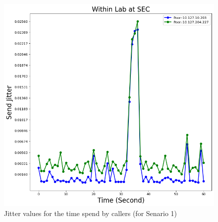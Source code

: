 	\begin{figure}[!b]
		\begin{minipage}{\textwidth}
			\includegraphics[scale=0.38]{Images/experiment/senarios/df_in_lab.png}
		\end{minipage}
		\caption{Jitter values for the time spend by callers (for Senario 1)}
		\label{fig:scene-out-1}
	\end{figure}


